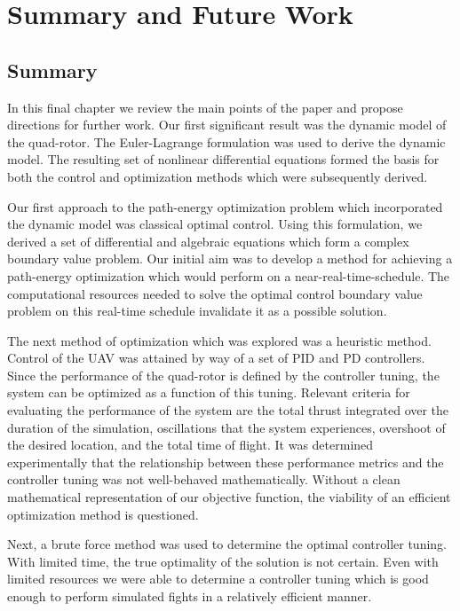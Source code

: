 
\chapter{Summary and Future Work} %

\label{Chapter8}


\section{Summary}
In this final chapter we review the main points of the paper and propose directions for further work. Our first significant result was the dynamic model of the quad-rotor. The Euler-Lagrange formulation was used to derive the dynamic model. The resulting set of nonlinear differential equations formed the basis for both the control and optimization methods which were subsequently derived.

Our first approach to the path-energy optimization problem which incorporated the dynamic model was classical optimal control. Using this formulation, we derived a set of differential and algebraic equations which form a complex boundary value problem. Our initial aim was to develop a method for achieving a path-energy optimization which would perform on a near-real-time-schedule. The computational resources needed to solve the optimal control boundary value problem on this real-time schedule invalidate it as a possible solution.

The next method of optimization which was explored was a heuristic method. Control of the UAV was attained by way of a set of PID and PD controllers. Since the performance of the quad-rotor is defined by the controller tuning, the system can be optimized as a function of this tuning. Relevant criteria for evaluating the performance of the system are the total thrust integrated over the duration of the simulation, oscillations that the system experiences, overshoot of the desired location, and the total time of flight. It was determined experimentally that the relationship between these performance metrics and the controller tuning was not well-behaved mathematically. Without a clean mathematical representation of our objective function, the viability of an efficient optimization method is questioned.

Next, a brute force method was used to determine the optimal controller tuning. With limited time, the true optimality of the solution is not certain. Even with limited resources we were able to determine a controller tuning which is good enough to perform simulated fights in a relatively efficient manner.

